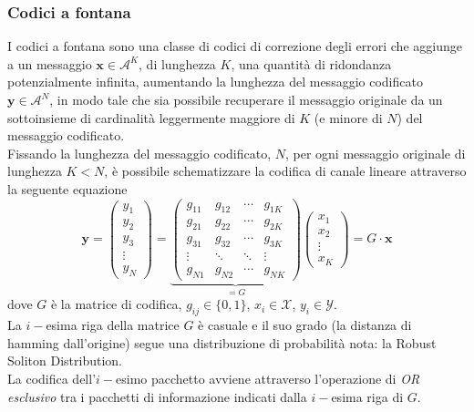 \documentclass[italian, a4paper, 12pt]{article}
\begin{document}
\subsubsection{Codici a fontana}\label{FCsection}
I codici a fontana sono una classe di codici di correzione degli errori che aggiunge a un messaggio $\bm{x}\in\mathcal{A}^K$, di lunghezza $K$, una quantità di ridondanza potenzialmente infinita, aumentando la lunghezza del messaggio codificato $\bm{y}\in\mathcal{A}^N$, in modo tale che sia possibile recuperare il messaggio originale da un sottoinsieme di cardinalità leggermente maggiore di $K$ (e minore di $N$) del messaggio codificato.\\
Fissando la lunghezza del messaggio codificato, $N$, per ogni messaggio originale di lunghezza $K<N$, è possibile schematizzare la codifica di canale lineare attraverso la seguente equazione
\begin{equation}
\bm{y} =
\begin{pmatrix}
y_1 \\y_2 \\y_3 \\\vdots \\y_N
\end{pmatrix} = \underbrace{\begin{pmatrix}
g_{11}	&g_{12}	&\cdots	&g_{1K}\\
g_{21}	&g_{22}	&\cdots	&g_{2K}\\
g_{31}	&g_{32}	&\cdots	&g_{3K}\\
\vdots &\ddots & \ddots &\vdots\\
g_{N1}	&g_{N2}	&\cdots	&g_{NK}
\end{pmatrix}}_{=G} \begin{pmatrix}
x_1 \\x_2 \\\vdots \\x_K
\end{pmatrix} = G \cdot \bm{x}
\end{equation}
dove $G$ è la matrice di codifica, $g_{ij}\in\{0,1\}$, $x_i\in\mathcal{X}$, $y_i\in\mathcal{Y}$.\\
La $i-$esima riga della matrice $G$ è casuale e il suo grado (la distanza di hamming dall'origine) segue una distribuzione di probabilità nota: la Robust Soliton Distribution.\\
La codifica dell'$i-$esimo pacchetto avviene attraverso l'operazione di \textit{OR esclusivo} tra i pacchetti di informazione indicati dalla $i-$esima riga di $G$.\\
\end{document}

